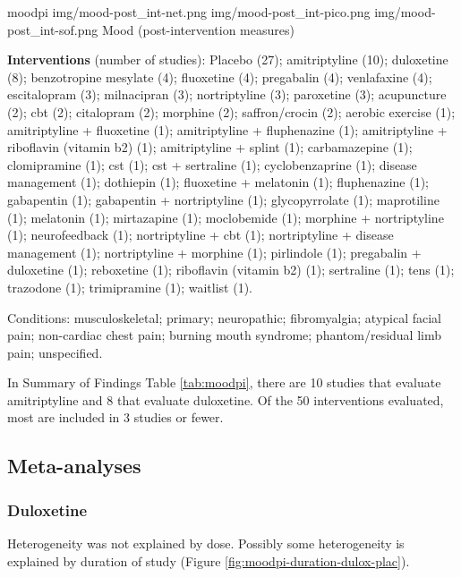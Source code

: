 \documentclass{report}\usepackage[]{graphicx}\usepackage[]{color}
\begin{document}
\soffignew
{moodpi}
{img/mood-post_int-net.png}
{img/mood-post_int-pico.png}
{img/mood-post_int-sof.png}
{Mood (post-intervention measures)}

\textbf{Interventions} (number of studies): Placebo (27); amitriptyline (10); duloxetine (8); benzotropine mesylate (4); fluoxetine (4); pregabalin (4); venlafaxine (4); escitalopram (3); milnacipran (3); nortriptyline (3); paroxetine (3); acupuncture (2); cbt (2); citalopram (2); morphine (2); saffron/crocin (2); aerobic exercise (1); amitriptyline + fluoxetine (1); amitriptyline + fluphenazine (1); amitriptyline + riboflavin (vitamin b2) (1); amitriptyline + splint (1); carbamazepine (1); clomipramine (1); cst (1); cst + sertraline (1); cyclobenzaprine (1); disease management (1); dothiepin (1); fluoxetine + melatonin (1); fluphenazine (1); gabapentin (1); gabapentin + nortriptyline (1); glycopyrrolate (1); maprotiline (1); melatonin (1); mirtazapine (1); moclobemide (1); morphine + nortriptyline (1); neurofeedback (1); nortriptyline + cbt (1); nortriptyline + disease management (1); nortriptyline + morphine (1); pirlindole (1); pregabalin + duloxetine (1); reboxetine (1); riboflavin (vitamin b2) (1); sertraline (1); tens (1); trazodone (1); trimipramine (1); waitlist (1).

Conditions: musculoskeletal; primary; neuropathic; fibromyalgia; atypical facial pain; non-cardiac chest pain; burning mouth syndrome; phantom/residual limb pain; unspecified.

In Summary of Findings Table \ref{tab:moodpi}, there are 10 studies that evaluate amitriptyline and 8 that evaluate duloxetine. Of the 50 interventions evaluated, most are included in 3 studies or fewer.

\subsection{Meta-analyses}

\subsubsection{Duloxetine}

Heterogeneity was not explained by dose. Possibly some heterogeneity is explained by duration of study (Figure \ref{fig:moodpi-duration-dulox-plac}).
\end{document}
